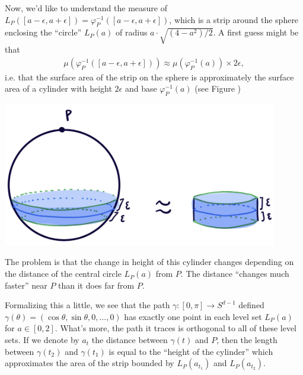 \begin{homework}[e]
\begin{soln}
    Now, we'd like to understand the measure of $L_P([a - \epsilon, a+\epsilon]) = \varphi^{-1}_P([a-\epsilon,a+\epsilon])$, which is a strip around the sphere enclosing the ``circle'' $L_P(a)$ of radius $a\cdot \sqrt{(4-a^2)/2}$. A first guess might be that
    \begin{align*}
      \mu(\varphi^{-1}_P([a-\epsilon,a+\epsilon])) \approx \mu(\varphi^{-1}_P(a)) \times 2\epsilon,
    \end{align*}
    i.e. that the surface area of the strip on the sphere is approximately the surface area of a cylinder with height $2\epsilon$ and base $\varphi^{-1}_P(a)$ (see Figure )
    \begin{center}
      \includegraphics[width=12cm]{figures/hwk1-drawing2.png}
      \label{fig:prob6-10}
    \end{center}
    The problem is that the change in height of this cylinder changes depending on the distance of the central circle $L_P(a)$ from $P$. The distance ``changes much faster'' near $P$ than it does far from $P$.

    Formalizing this a little, we see that the path $\gamma:[0,\pi]\to S^{d-1}$ defined $\gamma(\theta) = (\cos\theta,\sin\theta,0,...,0)$ has exactly one point in each level set $L_P(a)$ for $a \in [0,2]$. What's more, the path it traces is orthogonal to all of these level sets. If we denote by $a_t$ the distance between $\gamma(t)$ and $P$, then the length between $\gamma(t_2)$ and $\gamma(t_1)$ is equal to the ``height of the cylinder'' which approximates the area of the strip bounded by $L_P(a_{t_1})$ and $L_P(a_{t_2})$.


\end{soln}
\end{homework}
